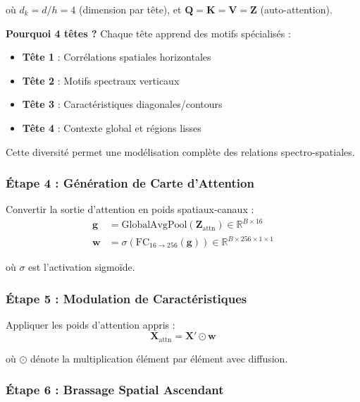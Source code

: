 \documentclass[conference]{IEEEtran}
\begin{document}
où $d_k = d/h = 4$ (dimension par tête), et $\mathbf{Q} = \mathbf{K} = \mathbf{V} = \mathbf{Z}$ (auto-attention).

\textbf{Pourquoi 4 têtes ?} Chaque tête apprend des motifs spécialisés :
\begin{itemize}
    \item \textbf{Tête 1} : Corrélations spatiales horizontales
    \item \textbf{Tête 2} : Motifs spectraux verticaux
    \item \textbf{Tête 3} : Caractéristiques diagonales/contours
    \item \textbf{Tête 4} : Contexte global et régions lisses
\end{itemize}

Cette diversité permet une modélisation complète des relations spectro-spatiales.

\subsubsection{Étape 4 : Génération de Carte d'Attention}

Convertir la sortie d'attention en poids spatiaux-canaux :
\begin{equation}
\begin{aligned}
\mathbf{g} &= \text{GlobalAvgPool}(\mathbf{Z}_{\text{attn}}) \in \mathbb{R}^{B \times 16} \\
\mathbf{w} &= \sigma(\text{FC}_{16 \rightarrow 256}(\mathbf{g})) \in \mathbb{R}^{B \times 256 \times 1 \times 1}
\end{aligned}
\end{equation}

où $\sigma$ est l'activation sigmoïde.

\subsubsection{Étape 5 : Modulation de Caractéristiques}

Appliquer les poids d'attention appris :
\begin{equation}
\mathbf{X}_{\text{attn}} = \mathbf{X}' \odot \mathbf{w}
\end{equation}

où $\odot$ dénote la multiplication élément par élément avec diffusion.

\subsubsection{Étape 6 : Brassage Spatial Ascendant}
\end{document}
